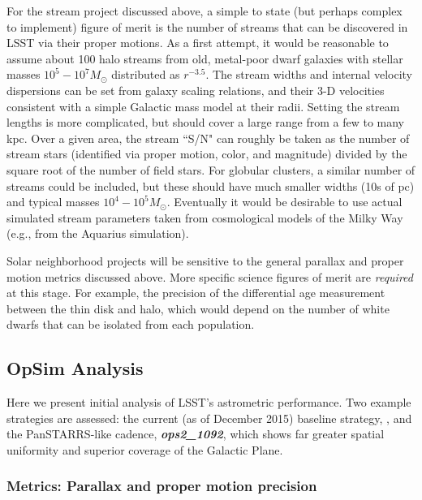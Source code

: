 For the stream project discussed above, a simple to state (but perhaps complex to implement) figure of merit
is the number of streams that can be discovered in LSST via their proper motions. As a first
attempt, it would be reasonable to assume about 100 halo streams from old, metal-poor dwarf galaxies with
stellar masses $10^5-10^7 M_{\odot}$ distributed as $r^{-3.5}$. The stream widths and internal velocity
dispersions can be set from galaxy scaling relations, and their 3-D velocities consistent with a simple Galactic mass
model at their radii. Setting the stream lengths is more complicated, but should cover a large range from a few to many kpc.
Over a given area, the stream ``S/N" can roughly be taken as the number of stream stars (identified via proper motion, color, and magnitude)
divided by the square root of the number of field stars. For globular clusters, a similar number of streams could be included, but these should have much smaller widths (10s of pc)
and typical masses $10^4-10^5 M_{\odot}$. Eventually it would be desirable to use actual simulated stream parameters taken from cosmological models of the Milky Way (e.g.,
from the Aquarius simulation).

Solar neighborhood projects will be sensitive to the general parallax and proper motion metrics discussed above. More specific science figures of merit are {\it required} at this stage.  For example, the precision of the differential age measurement between the thin disk and halo, which would depend on the number of white dwarfs that can be isolated
from each population.

\subsection{OpSim Analysis}
\label{sec:\secname:MW_Astrometry_OpSim}

Here we present initial analysis of LSST's astrometric
performance. Two example strategies are assessed: the current (as of
December 2015) baseline strategy, , and the
PanSTARRS-like cadence, {\it \bf ops2\_1092}, which shows far greater
spatial uniformity and superior coverage of the Galactic Plane.

\subsubsection{Metrics: Parallax and proper motion precision}

